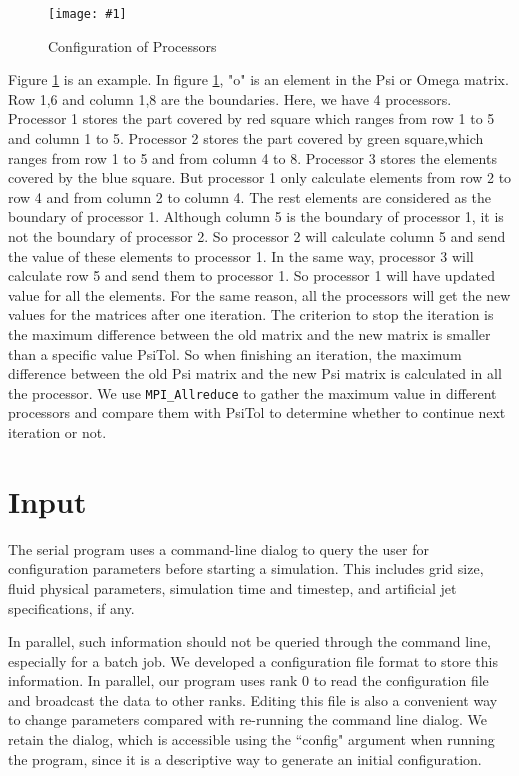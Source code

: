 \documentclass[twocolumn]{article}
\newcommand{\myimage}[3]{
\begin{figure}[!ht]
\caption{#2}
\label{#3}
\texttt{[image: \#1]}
\end{figure}
}
\begin{document}
\myimage{configuration.png}{Configuration of Processors}{fig:configuration}

Figure  \ref{fig:configuration} is an example.
In figure \ref{fig:configuration}, "o" is an element in the Psi or Omega matrix.
Row 1,6 and column 1,8 are the boundaries.
Here, we have 4 processors.
Processor 1 stores the part covered by red square
which ranges from row 1 to 5 and column 1 to 5.
Processor 2 stores the part covered by green square,which ranges from
row 1 to 5 and from column 4 to 8.
Processor 3 stores the elements covered by the blue square.
But processor 1 only calculate elements from row 2 to row 4 and from column
2 to column 4.
The rest elements are considered as the boundary of processor 1.
Although column 5 is the boundary of processor 1,  it is not the boundary
of processor 2.
So processor 2 will calculate column 5 and send the value of these elements
to processor 1. In the same way, processor 3 will calculate row 5 and send
them to processor 1.
So processor 1 will have updated value for all the elements.
For the same reason, all the processors will get the new values for the matrices
after one iteration.
The criterion to stop the iteration is the maximum difference between
the old matrix and the new matrix is smaller than a specific value PsiTol.
So when finishing an iteration, the maximum difference between the old Psi
matrix and the new Psi matrix is calculated in all the processor.
We use \texttt{MPI\_Allreduce} to gather the maximum value in different
processors and compare them with PsiTol to determine whether to continue
next iteration or not.

\section{Input}

The serial program uses a command-line dialog to query the user for
configuration parameters before starting a simulation.
This includes grid size, fluid physical parameters, simulation
time and timestep, and artificial jet specifications, if any.

In parallel, such information should not be queried through the
command line, especially for a batch job.
We developed a configuration file format to store this information.
In parallel, our program uses rank 0 to read the configuration file
and broadcast the data to other ranks.
Editing this file is also a convenient way to change parameters compared
with re-running the command line dialog.
We retain the dialog, which is accessible using the ``config" argument
when running the program, since it is a descriptive way to generate
an initial configuration.
\end{document}
